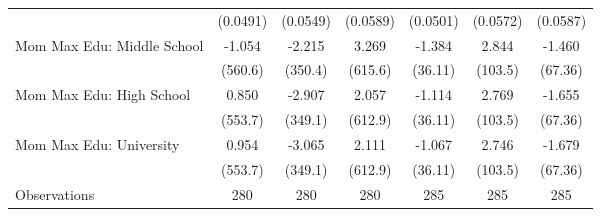 {\begin{tabular}{l*{6}{c}}
                    &    (0.0491)         &    (0.0549)         &    (0.0589)         &    (0.0501)         &    (0.0572)         &    (0.0587)         \\
\addlinespace
Mom Max Edu: Middle School&      -1.054         &      -2.215         &       3.269         &      -1.384         &       2.844         &      -1.460         \\
                    &     (560.6)         &     (350.4)         &     (615.6)         &     (36.11)         &     (103.5)         &     (67.36)         \\
\addlinespace
Mom Max Edu: High School&       0.850         &      -2.907         &       2.057         &      -1.114         &       2.769         &      -1.655         \\
                    &     (553.7)         &     (349.1)         &     (612.9)         &     (36.11)         &     (103.5)         &     (67.36)         \\
\addlinespace
Mom Max Edu: University&       0.954         &      -3.065         &       2.111         &      -1.067         &       2.746         &      -1.679         \\
                    &     (553.7)         &     (349.1)         &     (612.9)         &     (36.11)         &     (103.5)         &     (67.36)         \\
\midrule
Observations        &         280         &         280         &         280         &         285         &         285         &         285         \\
\bottomrule
\end{tabular}
}
